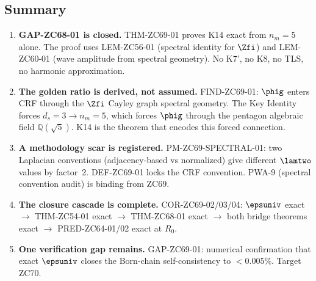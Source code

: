 \documentclass[12pt, a4paper]{article}
\begin{document}
\subsection{Summary}
\label{sec:summary}

\begin{enumerate}[leftmargin=*]

\item \textbf{GAP-ZC68-01 is closed.}
THM-ZC69-01 proves K14 exact from $n_m = 5$ alone.
The proof uses LEM-ZC56-01 (spectral identity for $\Zfi$)
and LEM-ZC60-01 (wave amplitude from spectral geometry).
No K7', no K8, no TLS, no harmonic approximation.

\item \textbf{The golden ratio is derived, not assumed.}
FIND-ZC69-01: $\phig$ enters CRF through the $\Zfi$
Cayley graph spectral geometry. The Key Identity
forces $d_s = 3 \to n_m = 5$, which forces $\phig$
through the pentagon algebraic field $\mathbb{Q}(\sqrt{5})$.
K14 is the theorem that encodes this forced connection.

\item \textbf{A methodology scar is registered.}
PM-ZC69-SPECTRAL-01: two Laplacian conventions
(adjacency-based vs normalized) give different $\lamtwo$
values by factor~2. DEF-ZC69-01 locks the CRF convention.
PWA-9 (spectral convention audit) is binding from ZC69.

\item \textbf{The closure cascade is complete.}
COR-ZC69-02/03/04: $\epsuniv$ exact $\to$ THM-ZC54-01
exact $\to$ THM-ZC68-01 exact $\to$ both bridge theorems
exact $\to$ PRED-ZC64-01/02 exact at $R_0$.

\item \textbf{One verification gap remains.}
GAP-ZC69-01: numerical confirmation that exact $\epsuniv$
closes the Born-chain self-consistency to $<0.005\%$.
Target ZC70.

\end{enumerate}
\end{document}
